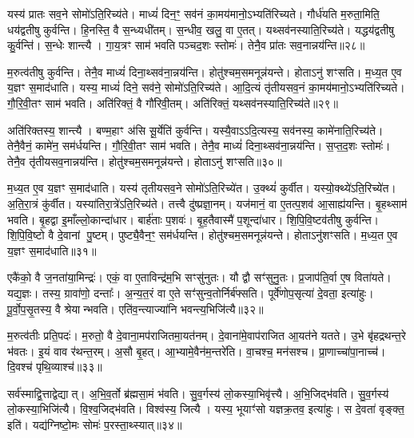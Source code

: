 यस्य॑ प्रातः सव॒ने सोमो॑\-ऽति॒रिच्य॑ते।
माध्यं॑ दिन॒ꣳ॒ सव॑नं का॒मय॑मानो॒\-ऽभ्यति॑रिच्यते।
गौर्ध॑यति म॒रुता॒मिति॒ धय॑द्वतीषु कुर्वन्ति।
हि॒नस्ति॒ वै स॒न्ध्यधी॑तम्।
स॒न्धीव॒ खलु॒ वा ए॒तत्।
यथ्सव॑नस्याति॒रिच्य॑ते।
यद्धय॑द्वतीषु कु॒र्वन्ति॑।
स॒न्धेः शान्त्यै।
गा॒य॒त्रꣳ साम॑ भवति पञ्चद॒शः स्तोमः॑।
तेनै॒व प्रा॑तः सव॒नान्नय॑न्ति॥२८॥

म॒रुत्व॑तीषु कुर्वन्ति।
तेनै॒व माध्यं॑ दिना॒थ्सव॑ना॒न्नय॑न्ति।
होतु॑श्चम॒समनून्न॑यन्ते।
होताऽनु॑ शꣳसति।
म॒ध्य॒त ए॒व य॒ज्ञꣳ स॒माद॑धाति।
यस्य॒ माध्यं॑ दिने॒ सव॑ने॒ सोमो॑\-ऽति॒रिच्य॑ते।
आ॒दि॒त्यं तृ॑तीयसव॒नं का॒मय॑मानो॒\-ऽभ्यति॑रिच्यते।
गौ॒रि॒वी॒तꣳ साम॑ भवति।
अति॑रिक्तं॒ वै गौ॑रिवी॒तम्।
अति॑रिक्तं॒ यथ्सव॑नस्याति॒रिच्य॑ते॥२९॥

अति॑रिक्तस्य॒ शान्त्यै।
बण्म॒हाꣳ अ॑सि सू॒र्येति॑ कुर्वन्ति।
यस्यै॒वा\-ऽऽदि॒त्यस्य॒ सव॑नस्य॒ कामे॑नाति॒रिच्य॑ते।
तेनै॒वैनं॒ कामे॑न॒ सम॑र्धयन्ति।
गौ॒रि॒वी॒तꣳ साम॑ भवति।
तेनै॒व माध्यं॑ दिना॒थ्सव॑ना॒न्नय॑न्ति।
स॒प्त॒द॒शः स्तोमः॑।
तेनै॒व तृ॑तीयसव॒नान्नय॑न्ति।
होतु॑श्चम॒समनून्न॑यन्ते।
होताऽनु॑ शꣳसति॥३०॥

म॒ध्य॒त ए॒व य॒ज्ञꣳ स॒माद॑धाति।
यस्य॑ तृतीयसव॒ने सोमो॑\-ऽति॒रिच्ये॑त।
उ॒क्थ्यं॑ कुर्वीत।
यस्यो॒क्थ्ये॑\-ऽति॒रिच्ये॑त।
अ॒ति॒रा॒त्रं कु॑र्वीत।
यस्या॑तिरा॒त्रे॑\-ऽति॒रिच्य॑ते।
तत्त्वै दु॑ष्प्रज्ञा॒नम्।
यज॑मानं॒ वा ए॒तत्प॒शव॑ आ॒साह्य॑यन्ति।
बृ॒हथ्साम॑ भवति।
बृ॒हद्वा इ॒माँल्लो॒कान्दा॑धार।
बार्\mbox{}ह॑ताः प॒शवः॑।
बृ॒ह॒तैवास्मै॑ प॒शून्दा॑धार।
शि॒पि॒वि॒ष्टव॑तीषु कुर्वन्ति।
शि॒पि॒वि॒ष्टो वै दे॒वानां पु॒ष्टम्।
पुष्ट्यै॒वैन॒ꣳ॒ सम॑र्धयन्ति।
होतु॑श्चम॒समनून्न॑यन्ते।
होताऽनु॑शꣳसति।
म॒ध्य॒त ए॒व य॒ज्ञꣳ स॒माद॑धाति॥३१॥\anuvakamend[य॒न्ति॒ सव॑नस्याति॒रिच्य॑ते शꣳसति दाधारा॒ष्टौ च॑]

एकै॑को॒ वै ज॒नता॑या॒मिन्द्रः॑।
एकं॒ वा ए॒ताविन्द्र॑म॒भि सꣳसु॑नुतः।
यौ द्वौ सꣳ॑सुनु॒तः।
प्र॒जाप॑ति॒र्वा ए॒ष विता॑यते।
यद्य॒ज्ञः।
तस्य॒ ग्रावा॑णो॒ दन्ताः᳚।
अ॒न्य॒त॒रं वा ए॒ते सꣳ॑सुन्व॒तोर्निर्ब॑फ्सति।
पूर्वे॑णोप॒सृत्या॑ दे॒वता॒ इत्या॑हुः।
पू॒र्वो॒प॒सृ॒तस्य॒ वै श्रेयान्भवति।
एति॑व॒न्त्याज्या॑नि भवन्त्य॒भिजि॑त्यै॥३२॥

म॒रुत्व॑तीः प्रति॒पदः॑।
म॒रुतो॒ वै दे॒वाना॒मप॑राजितमा॒यत॑नम्।
दे॒वाना॑मे॒वाप॑राजित आ॒यत॑ने यतते।
उ॒भे बृ॑हद्रथन्त॒रे भ॑वतः।
इ॒यं वाव र॑थन्त॒रम्।
अ॒सौ बृ॒हत्।
आ॒भ्यामे॒वैन॑म॒न्तरे॑ति।
वा॒चश्च॒ मन॑सश्च।
प्रा॒णाच्चा॑पा॒नाच्च॑।
दि॒वश्च॑ पृथि॒व्याश्च॑॥३३॥

सर्व॑स्माद्वि॒त्ताद्वेद्यात्।
अ॒भि॒व॒र्तो ब्र॑ह्मसा॒मं भ॑वति।
सु॒व॒र्गस्य॑ लो॒कस्या॒भिवृ॑त्त्यै।
अ॒भि॒जिद्भ॑वति।
सु॒व॒र्गस्य॑ लो॒कस्या॒भिजि॑त्यै।
वि॒श्व॒जिद्भ॑वति।
विश्व॑स्य॒ जित्यै।
यस्य॒ भूयाꣳ॑सो यज्ञक्र॒तव॒ इत्या॑हुः।
स दे॒वता॑ वृङ्क्त॒ इति॑।
यद्य॑ग्निष्टो॒मः सोमः॑ प॒रस्ता॒थ्स्यात्॥३४॥

